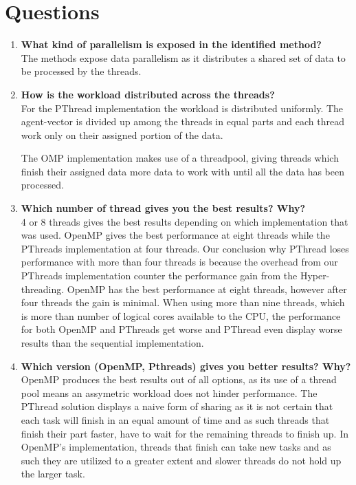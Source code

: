 \documentclass[a4paper,11pt]{article}
\begin{document}
\section{Questions}
\begin{enumerate}[label=\Alph*.]
\item \textbf{What kind of parallelism is exposed in the identified
  method?}\\
  The methods expose data parallelism as it distributes a shared set of data to be processed by the threads.
\item \textbf{How is the workload distributed across the threads?}\\
  For the PThread implementation the workload is distributed uniformly. The agent-vector is divided 
  up among the threads in equal parts and each thread work only on their assigned portion of the data.
  
  The OMP implementation makes use of a threadpool, giving threads which finish their assigned data more data 
  to work with until all the data has been processed.
  
\item \textbf{Which number of thread gives you the best results?
  Why?}\\ 4 or 8 threads gives the best results depending on which
  implementation that was used. OpenMP gives the best performance at eight
  threads while the PThreads implementation at four threads. Our
  conclusion why PThread loses performance with more than four threads is
  because the overhead from our PThreads implementation counter the
  performance gain from the Hyper-threading. OpenMP has the best
  performance at eight threads, however after four threads the gain is
  minimal. When using more than nine threads, which is more than number of
  logical cores available to the CPU, the performance for both OpenMP and PThreads get
  worse and PThread even display worse results than the sequential implementation.
\item \textbf{Which version (OpenMP, Pthreads) gives you better
  results? Why?}\\
  OpenMP produces the best results out of all options, as its use of a thread pool means an 
  assymetric workload does not hinder performance. The PThread solution displays a naive form of sharing as
  it is not certain that each task will finish in an equal amount of time and as such threads that finish their part
  faster, have to wait for the remaining threads to finish up. In OpenMP's implementation, threads that finish can
  take new tasks and as such they are utilized to a greater extent and slower threads do not hold up the larger task.
\end{enumerate}
\end{document}

